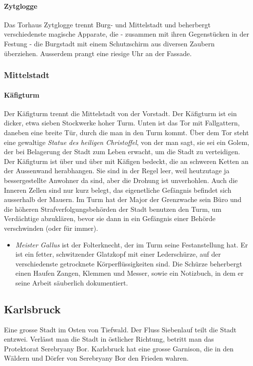 \documentclass[10pt,twoside,twocolumn,openany]{book}
\begin{document}
\paragraph{Zytglogge} Das Torhaus Zytglogge trennt Burg- und Mittelstadt und beherbergt verschiedenste magische Apparate, die - zusammen mit ihren Gegenstücken in der Festung - die Burgstadt mit einem Schutzschirm aus diversen Zaubern überziehen. Ausserdem prangt eine riesige Uhr an der Fassade.

\subsubsection{Mittelstadt}

\paragraph{Käfigturm} Der Käfigturm trennt die Mittelstadt von der Vorstadt. Der Käfigturm ist ein dicker, etwa sieben Stockwerke hoher Turm. Unten ist das Tor mit Fallgattern, daneben eine breite Tür, durch die man in den Turm kommt. Über dem Tor steht eine gewaltige \emph{Statue des heiligen Christoffel}, von der man sagt, sie sei ein Golem, der bei Belagerung der Stadt zum Leben erwacht, um die Stadt zu verteidigen. Der Käfigturm ist über und über mit Käfigen bedeckt, die an schweren Ketten an der Aussenwand herabhangen. Sie sind in der Regel leer, weil heutzutage ja bessergestellte Anwohner da sind, aber die Drohung ist unverhohlen. Auch die Inneren Zellen sind nur kurz belegt, das eigenetliche Gefängnis befindet sich ausserhalb der Mauern.
Im Turm hat der Major der Grenzwache sein Büro und die höheren Strafverfolgungsbehörden der Stadt benutzen den Turm, um Verdächtige abzuklären, bevor sie dann in ein Gefängnis einer Behörde verschwinden (oder für immer).
\begin{itemize}
	\item \textit{Meister Gallus} ist der Folterknecht, der im Turm seine Festanstellung hat. Er ist ein fetter, schwitzender Glatzkopf mit einer Lederschürze, auf der verschiedenste getrocknete Körperflüssigkeiten sind. Die Schürze beherbergt einen Haufen Zangen, Klemmen und Messer, sowie ein Notizbuch, in dem er seine Arbeit säuberlich dokumentiert.
\end{itemize}

\subsection{Karlsbruck}
Eine grosse Stadt im Osten von Tiefwald. Der Fluss Siebenlauf teilt die Stadt entzwei. Verlässt man die Stadt in östlicher Richtung, betritt man das Protektorat Serebryany Bor. Karlsbruck hat eine grosse Garnison, die in den Wäldern und Dörfer von Serebryany Bor den Frieden wahren.
\end{document}

